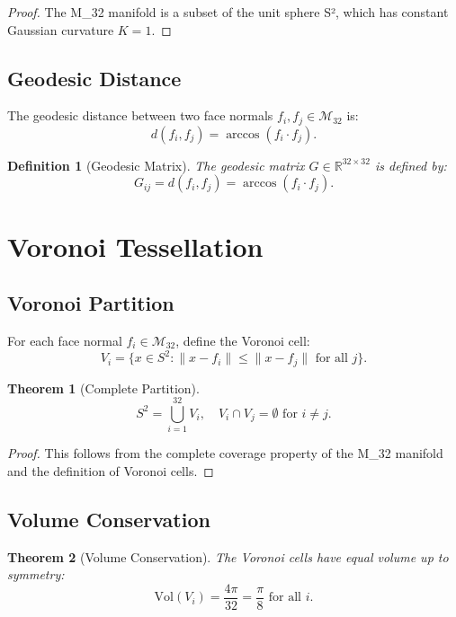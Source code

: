 \documentclass{article}
\newtheorem{theorem}{Theorem}
\newtheorem{definition}{Definition}
\theoremstyle{remark}
\begin{document}
\begin{proof}
The M_32 manifold is a subset of the unit sphere S², which has constant Gaussian curvature $K = 1$.
\end{proof}

\subsection{Geodesic Distance}

The geodesic distance between two face normals $f_i, f_j \in \mathcal{M}_{32}$ is:
\[
d(f_i, f_j) = \arccos(f_i \cdot f_j).
\]

\begin{definition}[Geodesic Matrix]
The geodesic matrix $G \in \mathbb{R}^{32 \times 32}$ is defined by:
\[
G_{ij} = d(f_i, f_j) = \arccos(f_i \cdot f_j).
\]
\end{definition}

\section{Voronoi Tessellation}

\subsection{Voronoi Partition}

For each face normal $f_i \in \mathcal{M}_{32}$, define the Voronoi cell:
\[
V_i = \{x \in S^2 : \|x - f_i\| \leq \|x - f_j\| \text{ for all } j\}.
\]

\begin{theorem}[Complete Partition]
\[
S^2 = \bigcup_{i=1}^{32} V_i, \quad V_i \cap V_j = \emptyset \text{ for } i \neq j.
\]
\end{theorem}

\begin{proof}
This follows from the complete coverage property of the M_32 manifold and the definition of Voronoi cells.
\end{proof}

\subsection{Volume Conservation}

\begin{theorem}[Volume Conservation]
The Voronoi cells have equal volume up to symmetry:
\[
\text{Vol}(V_i) = \frac{4\pi}{32} = \frac{\pi}{8} \text{ for all } i.
\]
\end{theorem}
\end{document}
